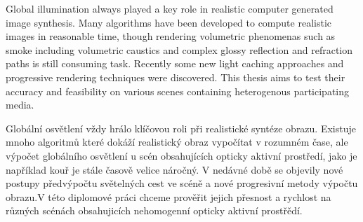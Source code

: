  
\abstractpage
\label{abstract}
Global illumination always played a key role in realistic computer generated image synthesis. Many algorithms have been developed to compute realistic images in reasonable time, though rendering volumetric phenomenas such as smoke including volumetric caustics and complex glossy reflection and refraction paths is still consuming task. Recently some new light caching approaches and progressive rendering techniques were discovered. This thesis aims to test their accuracy and feasibility on various scenes containing heterogenous participating media. 


\baselineskip

\noindent
Globální osvětlení vždy hrálo klíčovou roli při realistické syntéze obrazu. Existuje mnoho algoritmů které dokáží realistický obraz vypočítat v rozumném čase, ale výpočet globálního osvětlení u scén obsahujících opticky aktivní prostředí, jako je například kouř je stále časově velice náročný. V nedávné době se objevily nové postupy předvýpočtu světelných cest ve scéně a nové progresivní metody výpočtu obrazu.V této diplomové práci chceme prověřit jejich přesnost a rychlost na různých scénách obsahujicích nehomogenní opticky aktivní prostřědí.


